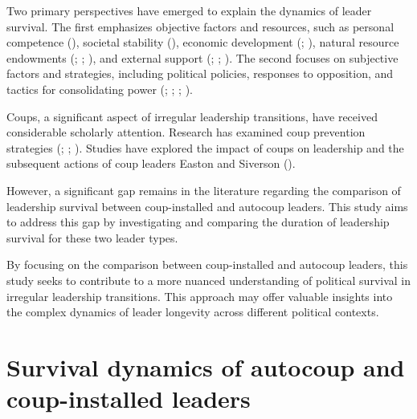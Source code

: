 \documentclass[
  12pt,
]{report}
\begin{document}
Two primary perspectives have emerged to explain the dynamics of leader
survival. The first emphasizes objective factors and resources, such as
personal competence (),
societal stability (), economic
development (;
), natural resource endowments
(;
;
), and
external support (;
; ). The second focuses on subjective factors and
strategies, including political policies, responses to opposition, and
tactics for consolidating power (; ;
;
).

Coups, a significant aspect of irregular leadership transitions, have
received considerable scholarly attention. Research has examined coup
prevention strategies (;
; ). Studies have explored the impact of coups on leadership
and the subsequent actions of coup leaders Easton and Siverson
().

However, a significant gap remains in the literature regarding the
comparison of leadership survival between coup-installed and autocoup
leaders. This study aims to address this gap by investigating and
comparing the duration of leadership survival for these two leader
types.

By focusing on the comparison between coup-installed and autocoup
leaders, this study seeks to contribute to a more nuanced understanding
of political survival in irregular leadership transitions. This approach
may offer valuable insights into the complex dynamics of leader
longevity across different political contexts.

\section{Survival dynamics of autocoup and coup-installed
leaders}\label{survival-dynamics-of-autocoup-and-coup-installed-leaders}
\end{document}
